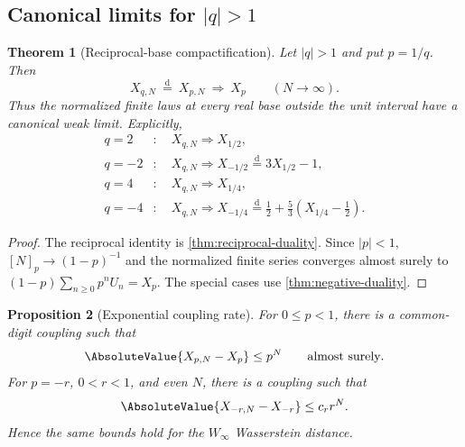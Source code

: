 \documentclass[11pt]{article}
\newtheorem{theorem}{Theorem}[section]
\newtheorem{proposition}[theorem]{Proposition}
\theoremstyle{definition}
\newcommand{\doteqL}{\mathrel{\stackrel{\mathrm d}=}}
\begin{document}
\subsection{Canonical limits for \texorpdfstring{$\lvert q\rvert>1$}{|q|>1}}

\begin{theorem}[Reciprocal-base compactification]\label{thm:outside-limit}
Let \(\lvert q\rvert>1\) and put \(p=1/q\).  Then
\begin{equation}
 X_{q,N}\ \doteqL\ X_{p,N}\ \Longrightarrow\ X_p
 \qquad(N\to\infty).                                     \label{eq:outside-limit}
\end{equation}
Thus the normalized finite laws at every real base outside the unit interval have a
canonical weak limit.  Explicitly,
\begin{align*}
 q=2&:\quad X_{q,N}\Longrightarrow X_{1/2},\\
 q=-2&:\quad X_{q,N}\Longrightarrow X_{-1/2}\doteqL3X_{1/2}-1,\\
 q=4&:\quad X_{q,N}\Longrightarrow X_{1/4},\\
 q=-4&:\quad X_{q,N}\Longrightarrow X_{-1/4}
 \doteqL\frac12+\frac53\left(X_{1/4}-\frac12\right).
\end{align*}
\end{theorem}

\begin{proof}
The reciprocal identity is \cref{thm:reciprocal-duality}.  Since \(\lvert p\rvert<1\),
\([N]_p\to(1-p)^{-1}\) and the normalized finite series converges almost surely to
\((1-p)\sum_{n\ge0}p^nU_n=X_p\).  The special cases use
\cref{thm:negative-duality}.
\end{proof}

\begin{proposition}[Exponential coupling rate]\label{prop:finite-rate}
For \(0\le p<1\), there is a common-digit coupling such that
\begin{equation}
 \AbsoluteValue{X_{p,N}-X_p}\le p^N\qquad\text{almost surely}.      \label{eq:positive-finite-rate}
\end{equation}
For \(p=-r\), \(0<r<1\), and even \(N\), there is a coupling such that
\begin{equation}
 \AbsoluteValue{X_{-r,N}-X_{-r}}\le c_rr^N.                         \label{eq:negative-finite-rate}
\end{equation}
Hence the same bounds hold for the \(W_\infty\) Wasserstein distance.
\end{proposition}
\end{document}
